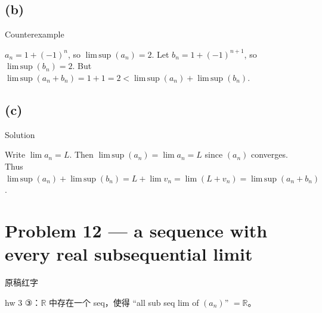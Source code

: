 \subsection{(b)}

\begin{qlsolution}{Counterexample}

\(a_{n} = 1 + \left( {- 1} \right)^{n}\), so \(\operatorname{lim\, sup}\left( a_{n} \right) = 2\). Let \(b_{n} = 1 + \left( {- 1} \right)^{n + 1}\), so \(\operatorname{lim\, sup}\left( b_{n} \right) = 2\). But \(\operatorname{lim\, sup}\left( {a_{n} + b_{n}} \right) = 1 + 1 = 2 < \operatorname{lim\, sup}\left( a_{n} \right) + \operatorname{lim\, sup}\left( b_{n} \right)\).

\end{qlsolution}

\subsection{(c)}

\begin{qlsolution}{Solution}

Write \(\lim a_{n} = L\). Then \(\operatorname{lim\, sup}\left( a_{n} \right) = \lim a_{n} = L\) since \(\left( a_{n} \right)\) converges. Thus \(\operatorname{lim\, sup}\left( a_{n} \right) + \operatorname{lim\, sup}\left( b_{n} \right) = L + \lim v_{n} = \lim\left( {L + v_{n}} \right) = \operatorname{lim\, sup}\left( {a_{n} + b_{n}} \right)\).

\end{qlsolution}

\section{Problem 12 --- a sequence with every real subsequential limit}

\begin{qlnote}{原稿红字}

hw 3 ③：\(\mathbb{R}\) 中存在一个 seq，使得 ``all sub seq lim of \(\left( a_{n} \right)\)'' \(= \mathbb{R}\)。

\end{qlnote}

